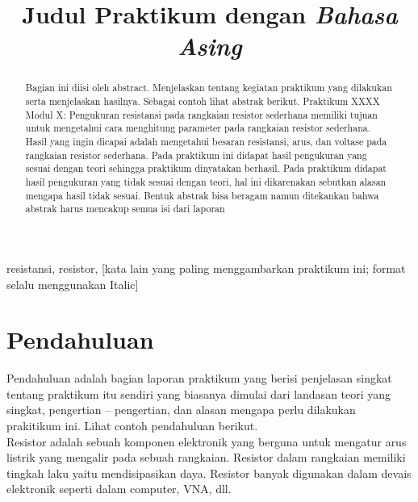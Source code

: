 \documentclass[conference]{IEEEtran}
\begin{document}
\title{Judul Praktikum dengan \emph{Bahasa Asing}}


\author{
}

\maketitle
\thispagestyle{fancy}

\begin{abstract}
Bagian ini diisi oleh abstract. Menjelaskan tentang kegiatan praktikum yang dilakukan serta menjelaskan hasilnya. Sebagai contoh lihat abstrak berikut. Praktikum XXXX Modul X: Pengukuran resistansi pada rangkaian resistor sederhana memiliki tujuan untuk mengetahui cara menghitung parameter pada rangkaian resistor sederhana. Hasil yang ingin dicapai adalah mengetahui besaran resistansi, arus, dan voltase pada rangkaian resistor sederhana. Pada praktikum ini didapat hasil pengukuran yang sesuai dengan teori sehingga praktikum dinyatakan berhasil. Pada praktikum didapat hasil pengukuran yang tidak sesuai dengan teori, hal ini dikarenakan {sebutkan alasan mengapa hasil tidak sesuai}. Bentuk abstrak bisa beragam namun ditekankan bahwa abstrak harus mencakup semua isi dari laporan 
\end{abstract}

\begin{IEEEkeywords}
resistansi, resistor, [kata lain yang paling menggambarkan praktikum ini; format selalu menggunakan Italic]
\end{IEEEkeywords}

\section{Pendahuluan}
Pendahuluan adalah bagian laporan praktikum yang berisi penjelasan singkat tentang praktikum itu sendiri yang biasanya dimulai dari landasan teori yang singkat, pengertian – pengertian, dan alasan mengapa perlu dilakukan prakitikum ini. Lihat contoh pendahuluan berikut.\\

Resistor adalah sebuah komponen elektronik yang berguna untuk mengatur arus listrik yang mengalir pada sebuah rangkaian. Resistor dalam rangkaian memiliki tingkah laku yaitu mendisipasikan daya. Resistor banyak digunakan dalam devais elektronik seperti dalam computer, VNA, dll.\\
\end{document}
